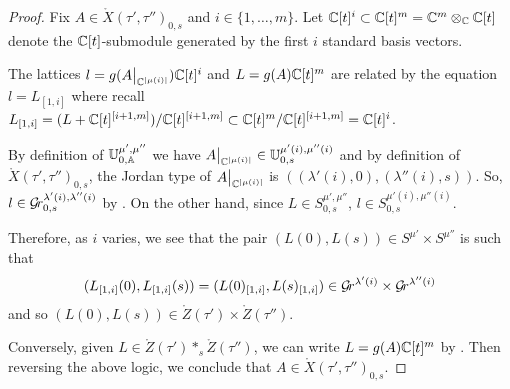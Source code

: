 \documentclass[draft]{article} %
\begin{document}
\begin{proof}
% 
Fix $A\in \mathring X(\tau',\tau'')_{0,s} $ and $i \in \{1,\dots, m\}$. 
% 
Let $\mathbb C[t]^i\subset\mathbb C[t]^m = \mathbb C^m\otimes_\mathbb C\mathbb C[t]$ denote the $\mathbb C[t]$-submodule generated by the first $i$ standard basis vectors.

The lattices $l=g(A\big|_{\mathbb C^{|\mu(i)|}})\mathbb C[t]^i$ and $L=g(A)\mathbb C[t]^m$ are related by the equation $ l = L_{[1,i]}$ where recall $L_{[1,i]} = (L + \mathbb C[t]^{[i+1,m]}) / \mathbb C[t]^{[i+1,m]}\subset \mathbb C[t]^m/\mathbb C[t]^{[i+1,m]} = \mathbb C[t]^i$. 
    
By definition of $\mathbb U^{\mu',\mu''}_{0,\mathbb A}$ we have $A\big|_{\mathbb C^{|\mu(i)|}}\in\mathbb U^{\mu'(i),\mu''(i)}_{0,s}$ and by definition of $\mathring X(\tau',\tau'')_{0,s}$, the Jordan type of $A\big|_{\mathbb C^{|\mu(i)|}}$ is $((\lambda'(i),0),(\lambda''(i),s))$. So, $l \in\mathcal{G}\!r_{0,s}^{\lambda'(i),\lambda''(i)}$ by . 
On the other hand, 
since $L\in S^{\mu',\mu''}_{0,s}$, $l\in S^{\mu'(i),\mu''(i)}_{0,s}$. 

Therefore, as $i$ varies, we see that the pair $(L(0),L(s))\in S^{\mu'}\times S^{\mu''}$ is such that 
$$
(L_{[1,i]}(0),L_{[1,i]}(s))  = (L(0)_{[1,i]},L(s)_{[1,i]}) \in \mathcal{G}\!r^{\lambda'(i)}\times\mathcal{G}\!r^{\lambda''(i)}
$$ 
and so $(L(0),L(s))\in \mathring Z(\tau')\times \mathring Z(\tau'')$. 

Conversely, given
$L\in\mathring Z(\tau')\ast_s \mathring Z(\tau'')$, we can write $ L = g(A)\mathbb C[t]^m$ by  .  Then reversing the above logic, we conclude that $ A \in \mathring X(\tau',\tau'')_{0,s}$.
% 
\end{proof}
% 
\end{document}

